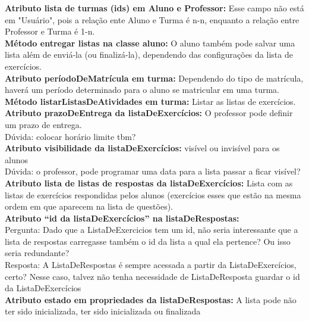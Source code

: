 \documentclass[12pt,letterpaper]{article}
\begin{document}
\textbf{Atributo lista de turmas (ids) em Aluno e Professor:}
Esse campo não está em "Usuário", pois a relação ente Aluno e Turma é n-n, enquanto a relação entre Professor e Turma é 1-n.\\


\textbf{Método entregar listas na classe aluno:}
O aluno também pode salvar uma lista além de enviá-la (ou finalizá-la), dependendo das configurações da lista de exercícios.\\


\textbf{Atributo períodoDeMatrícula em turma:}
Dependendo do tipo de matrícula, haverá um período determinado para o aluno se matricular em uma turma.\\


\textbf{Método listarListasDeAtividades em turma:}
Listar as listas de exercícios.\\


\textbf{Atributo prazoDeEntrega da listaDeExercícios:}
O professor pode definir um prazo de entrega.\\
Dúvida: colocar horário limite tbm?\\


\textbf{Atributo visibilidade da listaDeExercícios:}
visível ou invisível para os alunos\\
Dúvida: o professor, pode programar uma data para a lista passar a ficar visível?\\


\textbf{Atributo lista de listas de respostas da listaDeExercícios:}
Lista com as listas de exercícios respondidas pelos alunos (exercícios esses que estão na mesma ordem em que aparecem na lista de questões).\\


\textbf{Atributo “id da listaDeExercícios” na listaDeRespostas: }\\
Pergunta: Dado que a ListaDeExercicios tem um id, não seria interessante que a lista de respostas carregasse também o id da lista a qual ela pertence? Ou isso seria redundante?\\

Resposta: A ListaDeRespostas é sempre acessada a partir da ListaDeExercícios, certo? Nesse caso, talvez não tenha necessidade de ListaDeResposta guardar o id da ListaDeExercícios\\


\textbf{Atributo estado em propriedades da listaDeRespostas:}
A lista pode não ter sido inicializada, ter sido inicializada ou finalizada\\
\end{document}
